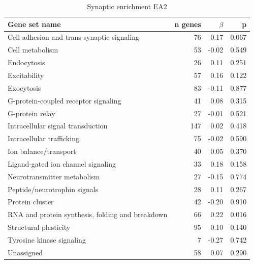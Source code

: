 \begin{table}[ht]
\centering
\begin{tabular}{lrrr}
  \toprule
Gene set name & n genes & $\beta$ & p\\
  \midrule
Cell adhesion and trans-synaptic signaling & 76 & 0.17 & 0.067 \\ 
  Cell metabolism & 53 & -0.02 & 0.549 \\ 
  Endocytosis & 26 & 0.11 & 0.251 \\ 
  Excitability & 57 & 0.16 & 0.122 \\ 
  Exocytosis & 83 & -0.11 & 0.877 \\ 
  G-protein-coupled receptor signaling & 41 & 0.08 & 0.315 \\ 
  G-protein relay & 27 & -0.01 & 0.521 \\ 
   Intracellular signal transduction & 147 & 0.02 & 0.418 \\ 
  Intracellular trafficking & 75 & -0.02 & 0.590 \\ 
  Ion balance/transport & 40 & 0.05 & 0.370 \\ 
  Ligand-gated ion channel signaling & 33 & 0.18 & 0.158 \\ 
  Neurotransmitter metabolism & 27 & -0.15 & 0.774 \\ 
  Peptide/neurotrophin signals & 28 & 0.11 & 0.267 \\ 
  Protein cluster & 42 & -0.20 & 0.910 \\ 
  RNA and protein synthesis, folding and breakdown & 66 & 0.22 & 0.016 \\ 
  Structural plasticity & 95 & 0.10 & 0.140 \\ 
  Tyrosine kinase signaling & 7 & -0.27 & 0.742 \\ 
  Unassigned & 58 & 0.07 & 0.290 \\ 
   \bottomrule
\end{tabular}
\caption{Synaptic enrichment EA2} 
\label{tab:MAGMA enrichment of synaptic groups EA2}
\end{table}
\clearpage
